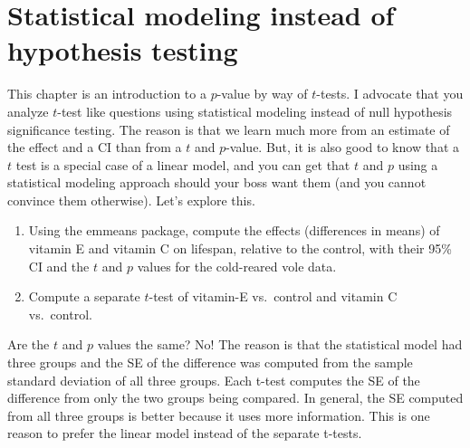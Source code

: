 \documentclass[]{book}
\providecommand{\tightlist}{%
  \setlength{\itemsep}{0pt}\setlength{\parskip}{0pt}}
\begin{document}
\section{Statistical modeling instead of hypothesis
testing}\label{statistical-modeling-instead-of-hypothesis-testing}

This chapter is an introduction to a \(p\)-value by way of \(t\)-tests.
I advocate that you analyze \(t\)-test like questions using statistical
modeling instead of null hypothesis significance testing. The reason is
that we learn much more from an estimate of the effect and a CI than
from a \(t\) and \(p\)-value. But, it is also good to know that a \(t\)
test is a special case of a linear model, and you can get that \(t\) and
\(p\) using a statistical modeling approach should your boss want them
(and you cannot convince them otherwise). Let's explore this.

\begin{enumerate}
\def\labelenumi{\arabic{enumi}.}
\tightlist
\item
  Using the emmeans package, compute the effects (differences in means)
  of vitamin E and vitamin C on lifespan, relative to the control, with
  their 95\% CI and the \(t\) and \(p\) values for the cold-reared vole
  data.
\item
  Compute a separate \(t\)-test of vitamin-E vs.~control and vitamin C
  vs.~control.
\end{enumerate}

Are the \(t\) and \(p\) values the same? No! The reason is that the
statistical model had three groups and the SE of the difference was
computed from the sample standard deviation of all three groups. Each
t-test computes the SE of the difference from only the two groups being
compared. In general, the SE computed from all three groups is better
because it uses more information. This is one reason to prefer the
linear model instead of the separate t-tests.
\end{document}
